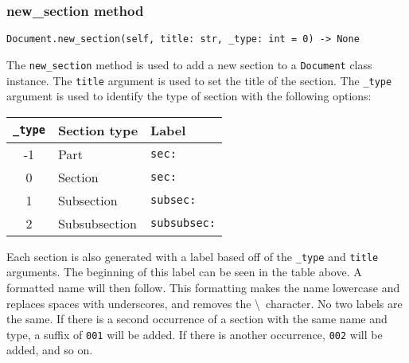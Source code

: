 \documentclass{article}
\begin{document}
\subsubsection{new\_section method}\label{subsubsec:new_section_method}
\begin{verbatim}
Document.new_section(self, title: str, _type: int = 0) -> None
\end{verbatim}
The \verb|new_section| method is used to add a new section to a \verb|Document| class instance. The \verb|title| argument is used to set the title of the section. The \verb|_type| argument is used to identify the type of section with the following options:
\begin{center}
\begin{tabular}{| c | l | l |}
\hline
{\verb|_type|} & Section type & Label \\ \hline
-1 & Part & \verb|sec:| \\
0 & Section & \verb|sec:| \\
1 & Subsection & \verb|subsec:| \\
2 & Subsubsection & \verb|subsubsec:| \\
\hline
\end{tabular}
\end{center}
Each section is also generated with a label based off of the \verb|_type| and \verb|title| arguments. The beginning of this label can be seen in the table above. A formatted name will then follow. This formatting makes the name lowercase and replaces spaces with underscores, and removes the \textbackslash\ character. No two labels are the same. If there is a second occurrence of a section with the same name and type, a suffix of \verb|001| will be added. If there is another occurrence, \verb|002| will be added, and so on.
\end{document}
